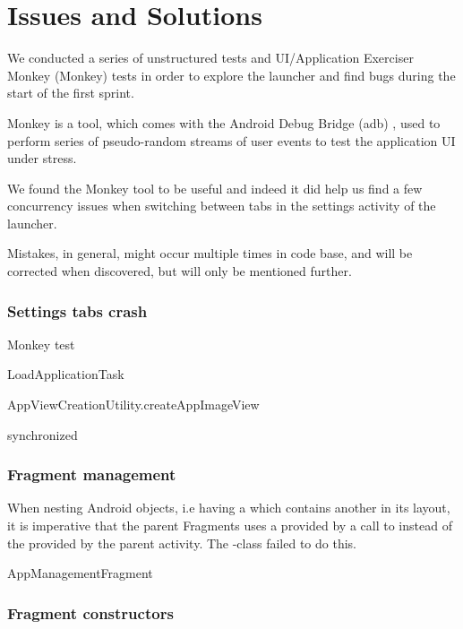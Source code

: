 
\chapter{Issues and Solutions}

We conducted a series of unstructured tests and UI/Application Exerciser Monkey (Monkey) \parencite{android_monkey} tests in order to explore the launcher and find bugs during the start of the first sprint. 

Monkey is a tool, which comes with the Android Debug Bridge (adb) \parencite{android_adb}, used to perform series of pseudo-random streams of user events to test the application UI under stress.

We found the Monkey tool to be useful and indeed it did help us find a few concurrency issues when switching between tabs in the settings activity of the launcher.

Mistakes, in general, might occur multiple times in code base, and will be corrected when discovered, but will only be  mentioned further.



\subsection{Settings tabs crash}



Monkey test

LoadApplicationTask

AppViewCreationUtility.createAppImageView

synchronized

\subsection{Fragment management}

When nesting Android  objects, i.e having a  which contains another  in its layout, it is imperative that the parent Fragments uses a  provided by a call to  instead of the  provided by the parent activity. The \giraf-class  failed to do this.   

AppManagementFragment




\subsection{Fragment constructors}

